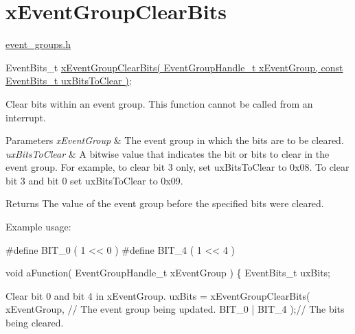 \hypertarget{group__xEventGroupClearBits}{\section{x\-Event\-Group\-Clear\-Bits}
\label{group__xEventGroupClearBits}
}
\hyperlink{event__groups_8h}{event\-\_\-groups.\-h} 
\begin{DoxyPre}
    EventBits\_t \hyperlink{event__groups_8h_a0fb72cfdd4f0d5f86d955fc3af448f2a}{xEventGroupClearBits( EventGroupHandle\_t xEventGroup, const EventBits\_t uxBitsToClear )};
 \end{DoxyPre}


Clear bits within an event group. This function cannot be called from an interrupt.


\begin{DoxyParams}{Parameters}
{\em x\-Event\-Group} & The event group in which the bits are to be cleared.\\
\hline
{\em ux\-Bits\-To\-Clear} & A bitwise value that indicates the bit or bits to clear in the event group. For example, to clear bit 3 only, set ux\-Bits\-To\-Clear to 0x08. To clear bit 3 and bit 0 set ux\-Bits\-To\-Clear to 0x09.\\
\hline
\end{DoxyParams}
\begin{DoxyReturn}{Returns}
The value of the event group before the specified bits were cleared.
\end{DoxyReturn}
Example usage\-: 
\begin{DoxyPre}
   #define BIT\_0    ( 1 << 0 )
   #define BIT\_4    ( 1 << 4 )\end{DoxyPre}



\begin{DoxyPre}   void aFunction( EventGroupHandle\_t xEventGroup )
   \{
   EventBits\_t uxBits;\end{DoxyPre}



\begin{DoxyPre}Clear bit 0 and bit 4 in xEventGroup.
        uxBits = xEventGroupClearBits(
                                xEventGroup,    // The event group being updated.
                                BIT\_0 | BIT\_4 );// The bits being cleared.\end{DoxyPre}



